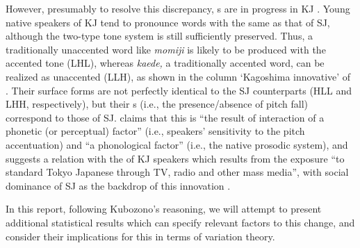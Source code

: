 \documentclass[output=paper]{LSP/langsci}
\begin{document}
However, presumably to resolve this discrepancy, s are in progress in KJ \citep{kubozono_tonal_2007}. Young native speakers of KJ tend to pronounce words with the same  as that of SJ, although the two-type tone system is still sufficiently preserved. Thus, a traditionally unaccented word like \textit{momiji }is likely to be produced with the accented tone (LHL), whereas \textit{kaede,} a traditionally accented word, can be realized as unaccented (LLH), as shown in the column ‘Kagoshima innovative’ of . Their surface forms are not perfectly identical to the SJ counterparts (HLL and LHH, respectively), but their s (i.e., the presence/absence of pitch fall) correspond to those of SJ. \citet[348]{kubozono_tonal_2007} claims that this  is ``the result of interaction of a phonetic (or perceptual) factor'' (i.e., speakers' sensitivity to the pitch accentuation) and ``a phonological factor'' (i.e., the native prosodic system), and suggests a relation with the  of KJ speakers which results from the exposure ``to standard Tokyo Japanese through TV, radio and other mass media'', with social dominance of SJ as the backdrop of this innovation \citep[323]{kubozono_tonal_2007}.
 
\begin{table} 
\caption{Surface tone and accentuation in SJ, Traditional KJ and Innovative KJ.}
\label{tab:2}
\end{table}

In this report, following Kubozono’s reasoning, we will attempt to present additional statistical results which can specify relevant factors to this change, and consider their implications for this  in terms of variation theory.
\end{document}
